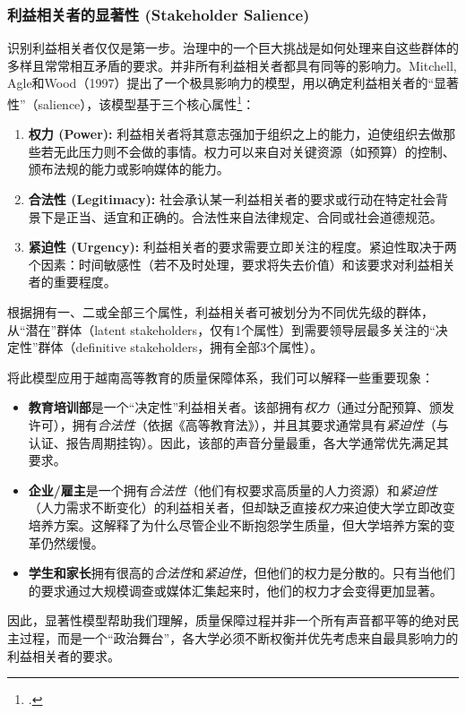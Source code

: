 
\subsubsection{利益相关者的显著性 (Stakeholder Salience)}

识别利益相关者仅仅是第一步。治理中的一个巨大挑战是如何处理来自这些群体的多样且常常相互矛盾的要求。并非所有利益相关者都具有同等的影响力。Mitchell, Agle和Wood（1997）提出了一个极具影响力的模型，用以确定利益相关者的“显著性”（salience），该模型基于三个核心属性\footcite{Mitchell1997}：

\begin{enumerate}
    \item \textbf{权力 (Power):} 利益相关者将其意志强加于组织之上的能力，迫使组织去做那些若无此压力则不会做的事情。权力可以来自对关键资源（如预算）的控制、颁布法规的能力或影响媒体的能力。
    \item \textbf{合法性 (Legitimacy):} 社会承认某一利益相关者的要求或行动在特定社会背景下是正当、适宜和正确的。合法性来自法律规定、合同或社会道德规范。
    \item \textbf{紧迫性 (Urgency):} 利益相关者的要求需要立即关注的程度。紧迫性取决于两个因素：时间敏感性（若不及时处理，要求将失去价值）和该要求对利益相关者的重要程度。
\end{enumerate}

根据拥有一、二或全部三个属性，利益相关者可被划分为不同优先级的群体，从“潜在”群体（latent stakeholders，仅有1个属性）到需要领导层最多关注的“决定性”群体（definitive stakeholders，拥有全部3个属性）。

将此模型应用于越南高等教育的质量保障体系，我们可以解释一些重要现象：
\begin{itemize}
    \item \textbf{教育培训部}是一个“决定性”利益相关者。该部拥有\textit{权力}（通过分配预算、颁发许可），拥有\textit{合法性}（依据《高等教育法》），并且其要求通常具有\textit{紧迫性}（与认证、报告周期挂钩）。因此，该部的声音分量最重，各大学通常优先满足其要求。
    \item \textbf{企业/雇主}是一个拥有\textit{合法性}（他们有权要求高质量的人力资源）和\textit{紧迫性}（人力需求不断变化）的利益相关者，但却缺乏直接\textit{权力}来迫使大学立即改变培养方案。这解释了为什么尽管企业不断抱怨学生质量，但大学培养方案的变革仍然缓慢。
    \item \textbf{学生和家长}拥有很高的\textit{合法性}和\textit{紧迫性}，但他们的权力是分散的。只有当他们的要求通过大规模调查或媒体汇集起来时，他们的权力才会变得更加显著。
\end{itemize}
因此，显著性模型帮助我们理解，质量保障过程并非一个所有声音都平等的绝对民主过程，而是一个“政治舞台”，各大学必须不断权衡并优先考虑来自最具影响力的利益相关者的要求。

